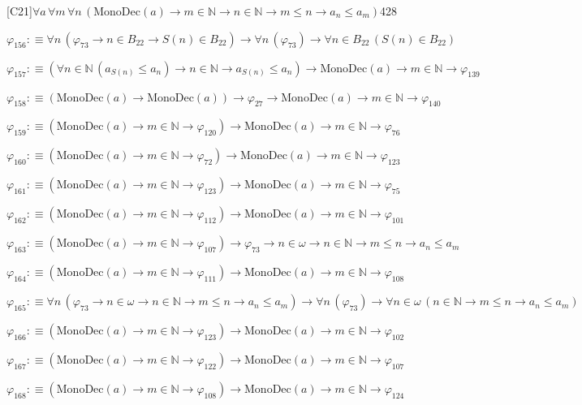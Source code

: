 \begin{fullproof}{[C21]}{$\forall a\,\forall m\,\forall n\,(\mathrm{MonoDec}(a) \to m \in \mathbb{N} \to n \in \mathbb{N} \to m \leq n \to a_{n} \leq a_{m})$}{428}
\begin{abbrevlist}
\item $\varphi_{156} :\equiv \forall n\,(\varphi_{73} \to n \in B_{22} \to S(n) \in B_{22}) \to \forall n\,(\varphi_{73}) \to \forall n \in B_{22}\,(S(n) \in B_{22})$
\item $\varphi_{157} :\equiv (\forall n \in \mathbb{N}\,(a_{S(n)} \leq a_{n}) \to n \in \mathbb{N} \to a_{S(n)} \leq a_{n}) \to \mathrm{MonoDec}(a) \to m \in \mathbb{N} \to \varphi_{139}$
\item $\varphi_{158} :\equiv (\mathrm{MonoDec}(a) \to \mathrm{MonoDec}(a)) \to \varphi_{27} \to \mathrm{MonoDec}(a) \to m \in \mathbb{N} \to \varphi_{140}$
\item $\varphi_{159} :\equiv (\mathrm{MonoDec}(a) \to m \in \mathbb{N} \to \varphi_{120}) \to \mathrm{MonoDec}(a) \to m \in \mathbb{N} \to \varphi_{76}$
\item $\varphi_{160} :\equiv (\mathrm{MonoDec}(a) \to m \in \mathbb{N} \to \varphi_{72}) \to \mathrm{MonoDec}(a) \to m \in \mathbb{N} \to \varphi_{123}$
\item $\varphi_{161} :\equiv (\mathrm{MonoDec}(a) \to m \in \mathbb{N} \to \varphi_{123}) \to \mathrm{MonoDec}(a) \to m \in \mathbb{N} \to \varphi_{75}$
\item $\varphi_{162} :\equiv (\mathrm{MonoDec}(a) \to m \in \mathbb{N} \to \varphi_{112}) \to \mathrm{MonoDec}(a) \to m \in \mathbb{N} \to \varphi_{101}$
\item $\varphi_{163} :\equiv (\mathrm{MonoDec}(a) \to m \in \mathbb{N} \to \varphi_{107}) \to \varphi_{73} \to n \in \omega \to n \in \mathbb{N} \to m \leq n \to a_{n} \leq a_{m}$
\item $\varphi_{164} :\equiv (\mathrm{MonoDec}(a) \to m \in \mathbb{N} \to \varphi_{111}) \to \mathrm{MonoDec}(a) \to m \in \mathbb{N} \to \varphi_{108}$
\item $\varphi_{165} :\equiv \forall n\,(\varphi_{73} \to n \in \omega \to n \in \mathbb{N} \to m \leq n \to a_{n} \leq a_{m}) \to \forall n\,(\varphi_{73}) \to \forall n \in \omega\,(n \in \mathbb{N} \to m \leq n \to a_{n} \leq a_{m})$
\item $\varphi_{166} :\equiv (\mathrm{MonoDec}(a) \to m \in \mathbb{N} \to \varphi_{123}) \to \mathrm{MonoDec}(a) \to m \in \mathbb{N} \to \varphi_{102}$
\item $\varphi_{167} :\equiv (\mathrm{MonoDec}(a) \to m \in \mathbb{N} \to \varphi_{122}) \to \mathrm{MonoDec}(a) \to m \in \mathbb{N} \to \varphi_{107}$
\item $\varphi_{168} :\equiv (\mathrm{MonoDec}(a) \to m \in \mathbb{N} \to \varphi_{108}) \to \mathrm{MonoDec}(a) \to m \in \mathbb{N} \to \varphi_{124}$

\end{abbrevlist}
\end{fullproof}
